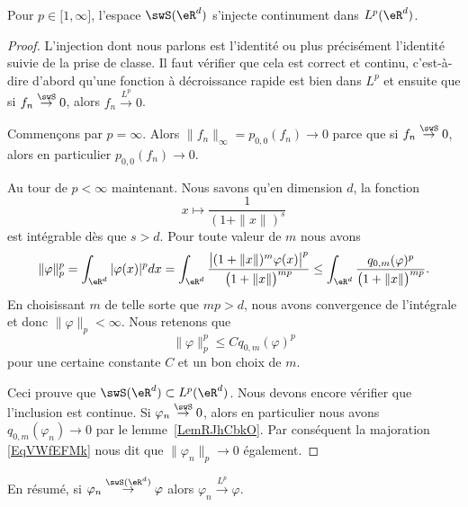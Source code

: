 \begin{proposition}     \label{PropGNXBeME}
	Pour \( p\in\mathopen[ 1 , \infty \mathclose]\), l'espace \( \swS(\eR^d)\) s'injecte continument dans \( L^p(\eR^d)\).
\end{proposition}

\begin{proof}
	L'injection dont nous parlons est l'identité ou plus précisément l'identité suivie de la prise de classe. Il faut vérifier que cela est correct et continu, c'est-à-dire d'abord qu'une fonction à décroissance rapide est bien dans \( L^p\) et ensuite que si \( f_n\stackrel{\swS}{\to}0\), alors \( f_n\stackrel{L^p}{\to}0\).

	Commençons par \( p=\infty\). Alors \( \| f_n \|_{\infty}=p_{0,0}(f_n)\to 0\) parce que si \( f_n\stackrel{\swS}{\to}0\), alors en particulier \( p_{0,0}(f_n)\to 0\).

	Au tour de \( p<\infty\) maintenant. Nous savons qu'en dimension \( d\), la fonction
	\begin{equation}
		x\mapsto \frac{1}{ (1+\| x \|)^s }
	\end{equation}
	est intégrable dès que \( s>d\).
	Pour toute valeur de \( m\) nous avons
	\begin{equation}
		\| \varphi \|_p^p=\int_{\eR^d}| \varphi(x) |^pdx=\int_{\eR^d}\frac{ \big|    (1+\| x \|)^m\varphi(x)   \big|^p }{ \big( 1+\| x \| \big)^{mp} }\leq\int_{\eR^d}\frac{q_{0,m}(\varphi)^p}{ \big( 1+\| x \| \big)^{mp} }.
	\end{equation}
	En choisissant \( m\) de telle sorte que \( mp>d\), nous avons convergence de l'intégrale et donc \( \| \varphi \|_p<\infty\). Nous retenons que
	\begin{equation}    \label{EqVWfEFMk}
		\| \varphi \|_p^p\leq Cq_{0,m}(\varphi)^p
	\end{equation}
	pour une certaine constante \( C\) et un bon choix de \( m\).

	Ceci prouve que \( \swS(\eR^d)\subset L^p(\eR^d)\). Nous devons encore vérifier que l'inclusion est continue. Si \( \varphi_n\stackrel{\swS}{\to}0\), alors en particulier nous avons \( q_{0,m}(\varphi_n)\to 0\) par le lemme~\ref{LemRJhCbkO}. Par conséquent la majoration \eqref{EqVWfEFMk} nous dit que \( \| \varphi_n \|_p\to 0\) également.

\end{proof}
En résumé, si \( \varphi_n\stackrel{\swS(\eR^d)}{\to}\varphi\) alors \( \varphi_n\stackrel{L^p}{\to}\varphi\).

